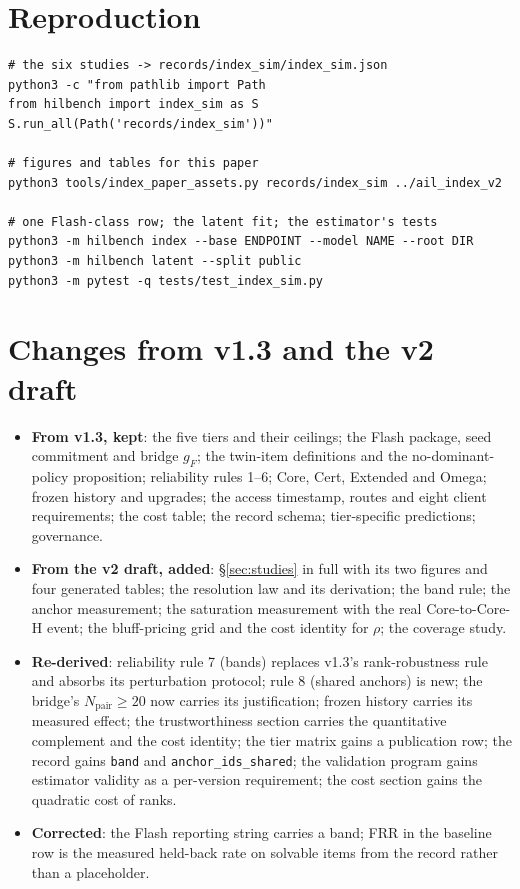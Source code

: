 \section{Reproduction}\label{app:repro}
\begin{verbatim}
# the six studies -> records/index_sim/index_sim.json
python3 -c "from pathlib import Path
from hilbench import index_sim as S
S.run_all(Path('records/index_sim'))"

# figures and tables for this paper
python3 tools/index_paper_assets.py records/index_sim ../ail_index_v2

# one Flash-class row; the latent fit; the estimator's tests
python3 -m hilbench index --base ENDPOINT --model NAME --root DIR
python3 -m hilbench latent --split public
python3 -m pytest -q tests/test_index_sim.py
\end{verbatim}

\section{Changes from v1.3 and the v2 draft}\label{app:changes}
\begin{itemize}[itemsep=1pt]
\item \textbf{From v1.3, kept}: the five tiers and their ceilings; the Flash package, seed commitment and bridge $g_F$; the twin-item definitions and the no-dominant-policy proposition; reliability rules 1--6; Core, Cert, Extended and Omega; frozen history and upgrades; the access timestamp, routes and eight client requirements; the cost table; the record schema; tier-specific predictions; governance.
\item \textbf{From the v2 draft, added}: \S\ref{sec:studies} in full with its two figures and four generated tables; the resolution law and its derivation; the band rule; the anchor measurement; the saturation measurement with the real Core-to-Core-H event; the bluff-pricing grid and the cost identity for $\rho$; the coverage study.
\item \textbf{Re-derived}: reliability rule 7 (bands) replaces v1.3's rank-robustness rule and absorbs its perturbation protocol; rule 8 (shared anchors) is new; the bridge's $N_{\text{pair}} \ge 20$ now carries its justification; frozen history carries its measured effect; the trustworthiness section carries the quantitative complement and the cost identity; the tier matrix gains a publication row; the record gains \texttt{band} and \texttt{anchor\_ids\_shared}; the validation program gains estimator validity as a per-version requirement; the cost section gains the quadratic cost of ranks.
\item \textbf{Corrected}: the Flash reporting string carries a band; FRR in the baseline row is the measured held-back rate on solvable items from the record rather than a placeholder.
\end{itemize}

